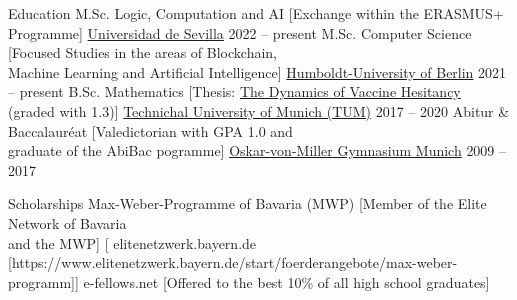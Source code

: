 \documentclass[
]{llresume}
\begin{document}
\makeheader

\begin{mainpane}
    \begin{mainsection}{Education}
        \entryJob
            {M.Sc. Logic, Computation and AI}
            [Exchange within the ERASMUS+ Programme]
            {\href{https://www.informatica.us.es/index.php/masteres/mulcia}{Universidad de Sevilla}}
            {2022 -- present}
        \entryJob
            {M.Sc. Computer Science}
            [Focused Studies in the areas of Blockchain,\\Machine Learning and Artificial Intelligence]
            {\href{https://www.informatik.hu-berlin.de/de/studium/Master/Master}{Humboldt-University of Berlin}}
            {2021 -- present}
        \entryJob
            {B.Sc. Mathematics}
            [Thesis: \href{https://julienandco.github.io/the-dynamics-of-vaccine-hesitancy/bachelor_thesis_julien_caselmann.pdf}{The Dynamics of Vaccine Hesitancy}\\(graded with 1.3)]
            {\href{https://www.ma.tum.de/}{Technichal University of Munich (TUM)}}
            {2017 -- 2020}
        \entryJob
            {Abitur \& Baccalauréat}
            [Valedictorian with GPA 1.0 and\\graduate of the AbiBac pogramme]
            {\href{https://www.ovmg.de/}{Oskar-von-Miller Gymnasium Munich}}
            {2009 -- 2017}
    \end{mainsection}

    \begin{mainsection}{Scholarships}
        \entryGeneric
            {Max-Weber-Programme of Bavaria (MWP)} 
            [Member of the Elite Network of Bavaria\\and the MWP]
            [\infoHomepage
                {elitenetzwerk.bayern.de}
                [https://www.elitenetzwerk.bayern.de/start/foerderangebote/max-weber-programm]]
        \entryGeneric
            {e-fellows.net} 
            [Offered to the best 10\% of all high school graduates]
    \end{mainsection}



\end{mainpane}
\end{document}
